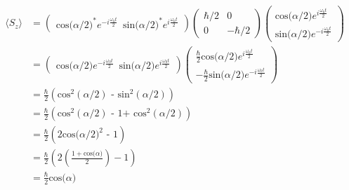 \begin{equation}
\begin{split}
\langle S_{z} \rangle & =  \begin{pmatrix} \textrm{cos($\alpha$/2)}^{*} e^{-i \frac{\omega_{0}t}{2}} \,\,\, \textrm{sin($\alpha$/2)}^{*} e^{i \frac{\omega_{0}t}{2}} \end{pmatrix}  \begin{pmatrix} \hbar/2 & 0\\ 0 & -\hbar/2 \end{pmatrix}\begin{pmatrix} \textrm{cos($\alpha$/2)} e^{i \frac{\omega_{0}t}{2}}\\ \textrm{sin($\alpha$/2)} e^{-i \frac{\omega_{0}t}{2}} \end{pmatrix} \\
& =  \begin{pmatrix} \textrm{cos($\alpha$/2)} e^{-i \frac{\omega_{0}t}{2}} \,\,\, \textrm{sin($\alpha$/2)} e^{i \frac{\omega_{0}t}{2}} \end{pmatrix}  \begin{pmatrix} \frac{\hbar}{2}\textrm{cos($\alpha$/2)} e^{i \frac{\omega_{0}t}{2}} \\ -\frac{\hbar}{2}\textrm{sin($\alpha$/2)} e^{-i \frac{\omega_{0}t}{2}} \end{pmatrix}  \\
& = \frac{\hbar}{2}(\textrm{cos$^{2}(\alpha/2)$ - sin$^{2}(\alpha/2)$}) \\
& = \frac{\hbar}{2}(\textrm{cos$^{2}(\alpha/2)$ - 1+ cos$^{2}(\alpha/2)$}) \\
& = \frac{\hbar}{2}(2\textrm{cos($\alpha/2)^{2}$ - 1}) \\
& = \frac{\hbar}{2}(2\left(\frac{1 + \textrm{cos($\alpha$)}}{2}\right) - 1) \\
& = \frac{\hbar}{2}\textrm{cos($\alpha$)}
\end{split}
\end{equation}

